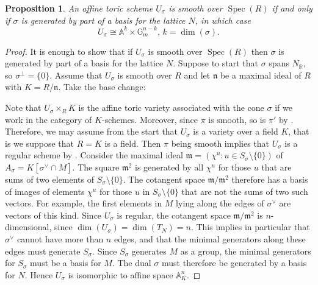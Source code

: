 \documentclass[10pt,a4paper]{book}
\newtheorem{prop}[thm]{Proposition}
\newcommand{\on}{\operatorname}
\DeclareMathOperator{\Spec}{Spec}
\newcommand{\mf}{\mathfrak}
\begin{document}
\begin{prop} An affine toric scheme $U_\sigma$ is smooth over $\Spec (R)$ if and only if $\sigma$ is generated by part of a basis for the lattice $N$, in which case
\[
U_\sigma \cong \mathbb{A}^k\times \mathbb{G}_m^{n-k} \text{, } k =\on{dim}(\sigma).
\]
\end{prop}
\begin{proof}
It is enough to show that if $U_\sigma$ is smooth over $\Spec (R)$ then $\sigma$ is generated by part of a basis for the lattice $N$. Suppose to start that $\sigma$ spans $N_\mathbb{R}$, so $\sigma^\perp = \{0\}$. Assume that $U_\sigma$ is smooth over $R$ and let $\mf{n}$ be a maximal ideal of $R$ with $K=R/\mf{n}$. Take the base change:
\begin{center}
\end{center}
Note that $U_\sigma \times_R K$ is the affine toric variety associated with the cone $\sigma$ if we work in the category of $K$-schemes. Moreover, since $\pi$ is smooth, so is $\pi'$ by \cite[Prop.~6.15]{gortz2010algebraic}. Therefore, we may assume from the start that $U_\sigma$ is a variety over a field $K$, that is we suppose that $R=K$ is a field. Then $\pi$ being smooth implies that $U_\sigma$ is a regular scheme by \cite[Lem.~6.26]{gortz2010algebraic}. Consider the maximal ideal $\mf{m} = (\chi^u:u\in S_\sigma\setminus \{0\})$ of $A_\sigma = K[\sigma^\vee\cap M]$. The square $\mf{m}^2$ is generated by all $\chi^u$ for those $u$ that are sums of two elements of $S_\sigma\setminus \{0\}$. The cotangent space $\mf{m}/\mf{m}^2$ therefore has a basis of images of elements $\chi^u$ for
those $u$ in $S_\sigma \setminus \{0\}$ that are not the sums of two such vectors. For
example, the first elements in $M$ lying along the edges of $\sigma^\vee$ are vectors of this kind. Since $U_\sigma$ is regular, 
the cotangent space $\mf{m}/\mf{m}^2$ is $n$-dimensional, since $\dim(U_\sigma) = \dim(T_N) = n$. This implies in particular that $\sigma^\vee$ cannot have more than $n$ edges, and that the
minimal generators along these edges must generate $S_\sigma$. Since $S_\sigma$ generates $M$ as a group, the minimal generators for $S_\sigma$ must be a basis for $M$. The dual $\sigma$ must therefore be generated by a basis for $N$. Hence $U_\sigma$ is isomorphic to affine space $\mathbb{A}^n_K$.


\end{proof}
\end{document}

